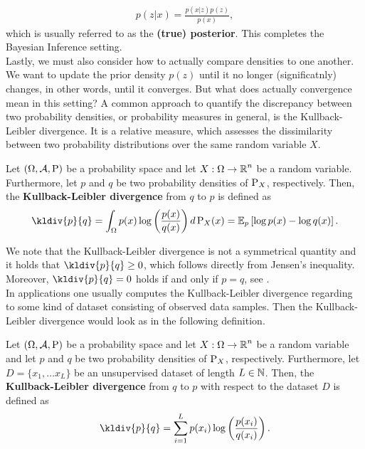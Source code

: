 \begin{align}\label{eq:posterior}
p(z|x) = \frac{p(x|z)p(z)}{p(x)},
\end{align}
which is usually referred to as the \textbf{(true) posterior}. This completes the Bayesian Inference setting.\\
Lastly, we must also consider how to actually compare densities to one another. We want to update the prior density $p(z)$ until it \glqq no longer (significatnly) changes\grqq{}, in other words, until it converges. But what does actually convergence mean in this setting? A common approach to quantify the discrepancy between two probability densities, or probability measures in general, is the Kullback-Leibler divergence. It is a relative measure, which assesses the dissimilarity between two probability distributions over the same random variable $X$.

\begin{definition}\label{def:KL_div}
Let $(\Omega,\operatorname{\mathcal{A}}, \operatorname{\text{P}})$ be a probability space and let $X:\Omega \to \operatorname{\mathbb{R}}^n$ be a random variable. Furthermore, let $p$ and $q$ be two probability densities of $\operatorname{\text{P}}_X$, respectively. Then, the \textbf{Kullback-Leibler divergence} from $q$ to $p$ is defined as
\begin{align}
\kldiv{p}{q} = \int_\O p(x) \log \left( \frac{p(x)}{q(x)}\right) d\prob_X(x) = \E_p \left[\log p(x) - \log q(x) \right].
\end{align}
\end{definition}

We note that the Kullback-Leibler divergence is not a symmetrical quantity and it holds that $\kldiv{p}{q}\geq 0$, which follows directly from Jensen's inequality. Moreover, $\kldiv{p}{q} = 0$ holds if and only if $p = q$, see \cite[Section~23.3]{klenke2013probability}.\\
In applications one usually computes the Kullback-Leibler divergence regarding to some kind of dataset consisting of observed data samples. Then the Kullback-Leibler divergence would look as in the following definition.

\begin{definition}\label{def:KL_div_data}
Let $(\Omega,\operatorname{\mathcal{A}}, \operatorname{\text{P}})$ be a probability space and let $X:\Omega \to \operatorname{\mathbb{R}}^n$ be a random variable and let $p$ and $q$ be two probability densities of $\operatorname{\text{P}}_X$, respectively. Furthermore, let $D=\{x_1, \ldots x_L\}$ be an unsupervised dataset of length $L\in\operatorname{\mathbb{N}}$. Then, the \textbf{Kullback-Leibler divergence} from $q$ to $p$ with respect to the dataset $D$ is defined as
\begin{align}
\kldiv{p}{q} = \sum_{i=1}^L p(x_i) \log \left( \frac{p(x_i)}{q(x_i)}\right).
\end{align}
\end{definition}


